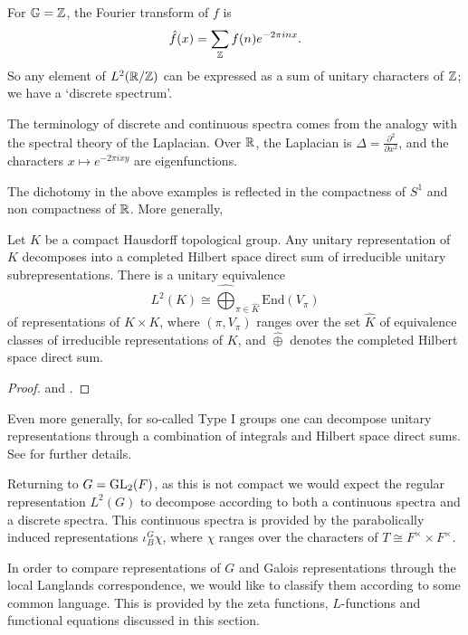 \begin{example}
    For $\mathbb G = \mathbb{Z}$, the Fourier transform of $f$ is 
    $$\hat{f}(x) = \sum_{\mathbb{Z}} f(n)e^{-2\pi i nx}.$$
    So any element of $L^2(\mathbb{R}/\mathbb{Z})$ can be expressed as a sum of unitary characters of $\mathbb{Z}$; we have a `discrete spectrum'. 
\end{example}

\begin{rem}
    The terminology of discrete and continuous spectra comes from the analogy with the spectral theory of the Laplacian. Over $\mathbb{R}$, the Laplacian is $\Delta = \frac{\partial^2}{\partial x^2}$, and the characters $x \mapsto e^{-2\pi i xy}$ are eigenfunctions. 
\end{rem}

The dichotomy in the above examples is reflected in the compactness of $S^1$ and non compactness of $\mathbb{R}$. More generally,

\begin{thm}
    Let $K$ be a compact Hausdorff topological group. Any unitary representation of $K$ decomposes into a completed Hilbert space direct sum of irreducible unitary subrepresentations. There is a unitary equivalence
    $$L^2(K) \cong \widehat{\bigoplus}_{\pi \in \hat{K}} \mathrm{End}(V_\pi)$$
    of representations of $K\times K$, where $(\pi,V_\pi)$ ranges over the set $\hat{K}$ of equivalence classes of irreducible representations of $K$, and $\hat\oplus$ denotes the completed Hilbert space direct sum.
\end{thm}
\begin{proof}
    \cite[Theorem 7.3.2]{DE} and \cite[Theorem 7.2.3]{DE}.
\end{proof}

Even more generally, for so-called Type I groups one can decompose unitary representations through a combination of integrals and Hilbert space direct sums. See \cite[Section 3.10]{GH1} for further details.

Returning to $G=\mathrm{GL}_2(F)$, as this is not compact we would expect the regular representation $L^2(G)$ to decompose according to both a continuous spectra and a discrete spectra. This continuous spectra is provided by the parabolically induced representations $\iota_B^G \chi$, where $\chi$ ranges over the characters of $T \cong F^\times \times F^\times$.

In order to compare representations of $G$ and Galois representations through the local Langlands correspondence, we would like to classify them according to some common language. This is provided by the zeta functions, $L$-functions and functional equations discussed in this section. 

